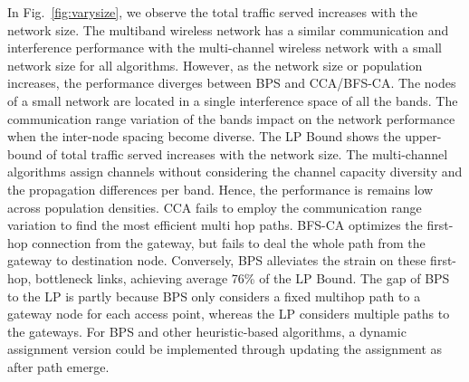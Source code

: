 In Fig.~\ref{fig:varysize}, we observe the total traffic served increases with the network size. 
The multiband wireless network has a similar communication and interference performance with 
the multi-channel wireless network with a small network size for all algorithms. 
However, as the network size or population increases, the performance diverges between BPS and 
CCA/BFS-CA.
The nodes of a small network are located in a single interference space of all the bands.
The communication range variation of the bands impact on the network performance when the inter-node spacing become diverse. 
The LP Bound shows the upper-bound of total traffic served increases with the network size.
The multi-channel algorithms assign channels without considering the channel capacity diversity and the propagation 
differences per band. Hence, the performance 
is remains low across population densities. 
CCA fails to employ the communication range variation to find the most efficient multi hop paths. 
BFS-CA optimizes the first-hop connection from the gateway, but fails to deal the whole path 
from the gateway to destination node. Conversely, BPS alleviates the strain on these first-hop, 
bottleneck links, achieving average 76\% of the LP Bound. The gap of BPS to the LP is partly because 
BPS only considers a fixed multihop path to a gateway node for each access point, whereas the 
LP considers multiple paths to the gateways. For BPS and other heuristic-based algorithms, a dynamic 
assignment version could be implemented through updating the assignment as after path emerge.

